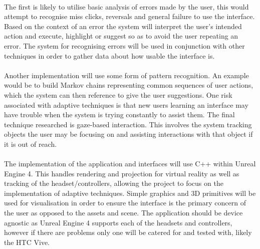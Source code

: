 \documentclass[11pt]{article}
\begin{document}
\paragraph{} 
The first is likely to utilise basic analysis of errors made by the user, this would attempt to recognise miss clicks, reversals and general failure to use the interface. Based on the context of an error the system will interpret the user's intended action and execute, highlight or suggest so as to avoid the user repeating an error. The system for recognising errors will be used in conjunction with other techniques in order to gather data about how usable the interface is.

\paragraph{} 
Another implementation will use some form of pattern recognition. An example would be to build Markov chains representing common sequences of user actions, which the system can then reference to give the user suggestions. One risk associated with adaptive techniques is that new users learning an interface may have trouble when the system is trying constantly to assist them. The final technique researched is gaze-based interaction. This involves the system tracking objects the user may be focusing on and assisting interactions with that object if it is out of reach.

\paragraph{} 
The implementation of the application and interfaces will use C++ within Unreal Engine 4. This handles rendering and projection for virtual reality as well as tracking of the headset/controllers, allowing the project to focus on the implementation of adaptive techniques. Simple graphics and 3D primitives will be used for visualisation in order to ensure the interface is the primary concern of the user as opposed to the assets and scene. The application should be device agnostic as Unreal Engine 4 supports each of the headsets and controllers, however if there are problems only one will be catered for and tested with, likely the HTC Vive.
\end{document}
